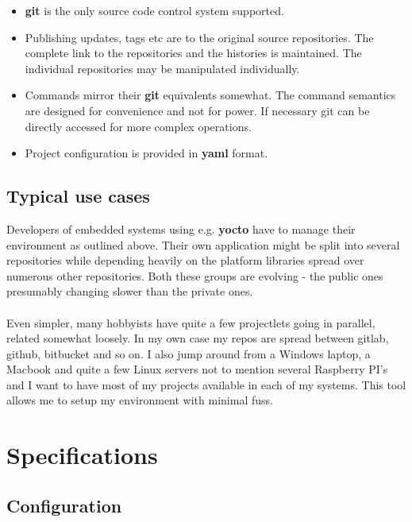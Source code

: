 \documentclass[11pt, a4paper]{article} %
\begin{document}
\begin{itemize}
    \item \textbf{git} is the only source code control system supported.
    \item Publishing updates, tags etc are to the original source repositories. The complete link to the repositories and the histories is maintained. The individual repositories may be manipulated individually.
    \item Commands mirror their \textbf{git} equivalents somewhat. The command semantics are designed for convenience and not for power. If necessary git can be directly accessed for more complex operations.
    \item Project configuration is provided in \textbf{yaml} format.
\end{itemize}

\subsection{Typical use cases}

Developers of embedded systems using e.g. \textbf{yocto}  have to manage their environment as outlined above. Their own application might be split into several repositories while depending heavily on the platform libraries spread over numerous other repositories. Both these groups are evolving - the public ones presumably changing slower than the private ones.

\paragraph{} Even simpler, many hobbyists have quite a few projectlets going in parallel, related somewhat loosely. In my own case my repos are spread between gitlab, github, bitbucket and so on. I also jump around from a Windows laptop, a Macbook and quite a few Linux servers not to mention several Raspberry PI's and I want to have most of my projects available in each of my systems. This tool allows me to setup my environment with minimal fuss.

\section{Specifications}

\subsection{Configuration}
\end{document}
